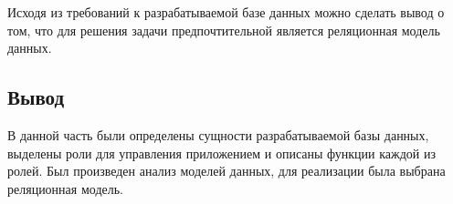 Исходя из требований к разрабатываемой базе данных можно сделать вывод о том, что для решения задачи предпочтительной является реляционная модель данных.


\subsection*{Вывод}

В данной часть были определены сущности разрабатываемой базы данных, выделены роли для управления приложением и описаны функции каждой из ролей. Был произведен анализ моделей данных, для реализации была выбрана реляционная модель.


